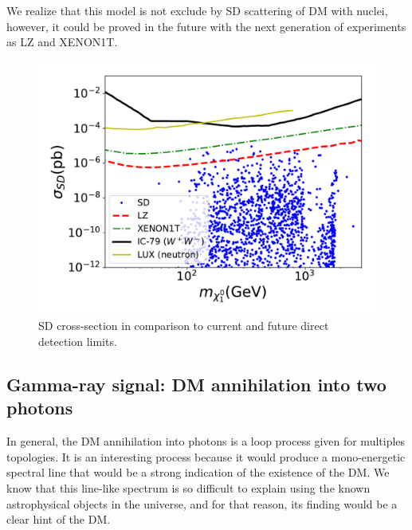\documentclass[12pt,letterpaper]{article}
\begin{document}
We realize that this model is not exclude by SD scattering of DM with nuclei, however, it could be proved in the future with the next generation of experiments as LZ and XENON1T.
%
\begin{figure}[h]
\begin{center}
\includegraphics[scale=0.5]{sigmaSD_with_neutrino_physics}
\caption{ SD cross-section  in comparison to current and future direct detection limits.  
}
\label{fig:SD-scan}
\end{center}
\end{figure}
%








\subsection{Gamma-ray signal: DM annihilation into two photons}
\label{sec:gamma-ray}
  
In general, the DM annihilation into photons is a loop process given for multiples topologies. 
It is an interesting process because it would produce a mono-energetic spectral line that would be a strong indication of the existence of the DM. We know that this line-like spectrum is so difficult to explain using the known astrophysical objects in the universe, and for that reason, its finding would be a clear hint of the DM.
     
\end{document}
